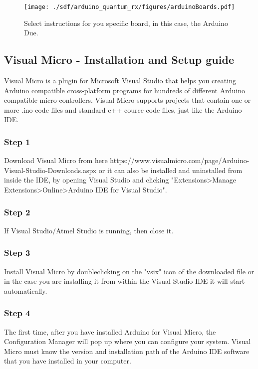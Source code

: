 \begin{refsection}
	\begin{figure}[H]
		\centering
		\texttt{[image: ./sdf/arduino\_quantum\_rx/figures/arduinoBoards.pdf]}
		\caption{Select instructions for you specific board, in this case, the Arduino Due.}
		\label{arduinoDownload}
	\end{figure}
	
	\subsection{Visual Micro - Installation and Setup guide}
	Visual Micro is a plugin for Microsoft Visual Studio that helps you creating Arduino compatible cross-platform programs for hundreds of different Arduino compatible micro-controllers. Visual Micro supports projects that contain one or more .ino code files and standard c++ cource code files, just like the Arduino IDE.
	
	
	\subsubsection{Step 1}
	Download Visual Micro from here https://www.visualmicro.com/page/Arduino-Visual-Studio-Downloads.aspx or it can also be installed and uninstalled from inside the IDE, by opening Visual Studio and clicking "Extensions>Manage Extensions>Online>Arduino IDE for Visual Studio".
	
	\subsubsection{Step 2}
	If Visual Studio/Atmel Studio is running, then close it.
	
	\subsubsection{Step 3}
	Install Visual Micro by doubleclicking on the "vsix" icon of the downloaded file or in the case you are installing it from within the Visual Studio IDE it will start automatically.
	
	\subsubsection{Step 4}
	
	The first time, after you have installed Arduino for Visual Micro, the Configuration Manager will pop up where you can configure your system. Visual Micro must know the version and installation path of the Arduino IDE software that you have installed in your computer.
	

\end{refsection}
